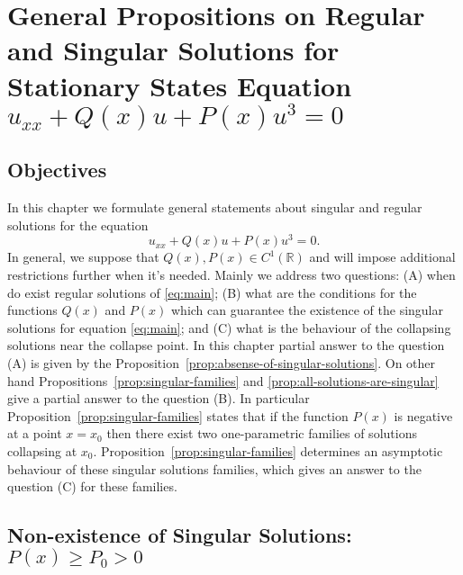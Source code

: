 \chapter{General Propositions on Regular and Singular Solutions for Stationary States Equation $u_{xx} + Q(x) u + P(x) u^3 = 0$}

\section{Objectives}

In this chapter we formulate general statements about singular and regular solutions for the equation
\begin{equation}
	u_{xx} + Q(x) u + P(x) u^3 = 0.
	\label{eq:main}
\end{equation}
In general, we suppose that $Q(x), P(x) \in C^1(\mathbb{R})$ and will impose additional restrictions further when it's needed.
Mainly we address two questions: (A) when do exist regular solutions of \eqref{eq:main}; (B) what are the conditions for the functions $Q(x)$ and $P(x)$ which can guarantee the existence of the singular solutions for equation \eqref{eq:main}; and (C) what is the behaviour of the collapsing solutions near the collapse point.
In this chapter partial answer to the question (A) is given by the Proposition~\ref{prop:absense-of-singular-solutions}.
On other hand Propositions~\ref{prop:singular-families} and \ref{prop:all-solutions-are-singular} give a partial answer to the question (B).
In particular Proposition~\ref{prop:singular-families} states that if the function $P(x)$ is negative at a point $x = x_0$ then there exist two one-parametric families of solutions collapsing at $x_0$.
Proposition~\ref{prop:singular-families} determines an asymptotic behaviour of these singular solutions families, which gives an answer to the question (C) for these families.

\section{Non-existence of Singular Solutions: $P(x) \ge P_0 > 0$}

